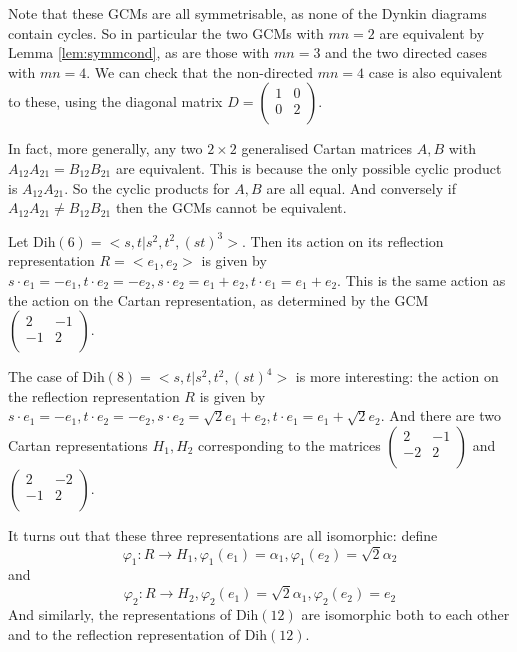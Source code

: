 \documentclass[11pt,a4paper]{report}
\theoremstyle{definition}
\begin{document}
Note that these GCMs are all symmetrisable, as none of the Dynkin diagrams contain cycles. So in particular the two GCMs with $mn = 2$ are equivalent by Lemma \ref{lem:symmcond}, as are those with $mn = 3$ and the two directed cases with $mn = 4$. We can check that the non-directed $mn = 4$ case is also equivalent to these, using the diagonal matrix $D = \begin{pmatrix}1 & 0\\0 & 2\\\end{pmatrix}$. 

In fact, more generally, any two $2 \times 2$ generalised Cartan matrices $A, B$ with $A_{12} A_{21} = B_{12} B_{21}$ are equivalent. This is because the only possible cyclic product is $A_{12} A_{21}$. So the cyclic products for $A, B$ are all equal. And conversely if $A_{12} A_{21} \neq B_{12} B_{21}$ then the GCMs cannot be equivalent.

Let $\text{Dih}(6) = <s, t|s^2, t^2, (st)^3>$. Then its action on its reflection representation $R = <e_1, e_2>$ is given by $s \cdot e_1 = - e_1, t \cdot e_2 = - e_2, s \cdot e_2 = e_1 + e_2, t \cdot e_1 = e_1 + e_2$. This is the same action as the action on the Cartan representation, as determined by the GCM $\begin{pmatrix}2 & -1\\-1 & 2\\\end{pmatrix}$.

The case of $\text{Dih}(8) = <s,t|s^2, t^2, (st)^4>$ is more interesting: the action on the reflection representation $R$ is given by $s \cdot e_1 = - e_1, t \cdot e_2 = - e_2, s \cdot e_2 = \sqrt{2} e_1 + e_2, t \cdot e_1 = e_1 + \sqrt{2} e_2$. And there are two Cartan representations $H_1, H_2$ corresponding to the matrices $\begin{pmatrix}2 & -1\\-2 & 2\\\end{pmatrix}$ and $\begin{pmatrix}2 & -2\\-1 & 2\\\end{pmatrix}$.

It turns out that these three representations are all isomorphic: define \begin{equation*}\varphi_1: R \to H_1, \varphi_1(e_1) = \alpha_1, \varphi_1(e_2) = \sqrt{2} \alpha_2\end{equation*} and \begin{equation*}\varphi_2: R \to H_2, \varphi_2(e_1) = \sqrt{2} \alpha_1, \varphi_2(e_2) = e_2\end{equation*} And similarly, the representations of $\text{Dih}(12)$ are isomorphic both to each other and to the reflection representation of $\text{Dih}(12)$.
\end{document}
